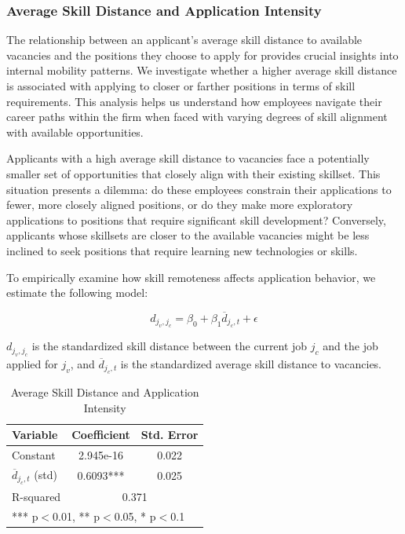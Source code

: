 \documentclass[12pt]{article}
\begin{document}
\subsubsection{Average Skill Distance and Application Intensity}

The relationship between an applicant's average skill distance to available vacancies and the positions they choose to apply for provides crucial insights into internal mobility patterns. We investigate whether a higher average skill distance is associated with applying to closer or farther positions in terms of skill requirements. This analysis helps us understand how employees navigate their career paths within the firm when faced with varying degrees of skill alignment with available opportunities.

Applicants with a high average skill distance to vacancies face a potentially smaller set of opportunities that closely align with their existing skillset. This situation presents a dilemma: do these employees constrain their applications to fewer, more closely aligned positions, or do they make more exploratory applications to positions that require significant skill development? Conversely, applicants whose skillsets are closer to the available vacancies might be less inclined to seek positions that require learning new technologies or skills.

To empirically examine how skill remoteness affects application behavior, we estimate the following model:

\begin{equation}
    d_{j_v, j_c} = \beta_0 + \beta_1 \overline{d}_{j_c, t} + \epsilon
\end{equation}

$d_{j_v, j_c}$ is the standardized skill distance between the current job $j_c$ and the job applied for $j_v$, and $\overline{d}_{j_c, t}$ is the standardized average skill distance to vacancies.


\begin{table}[h]
\centering
\caption{Average Skill Distance and Application Intensity} 
\renewcommand{\arraystretch}{1.2}
\begin{tabular}{lcc}
\hline
\textbf{Variable} & \textbf{Coefficient} & \textbf{Std. Error} \\
\hline
Constant & 2.945e-16 & 0.022 \\
$\overline{d}_{j_c, t}$ (std) & 0.6093*** & 0.025 \\
\hline
R-squared & \multicolumn{2}{c}{0.371} \\
\hline
\multicolumn{3}{l}{*** p$<$0.01, ** p$<$0.05, * p$<$0.1} \\
\end{tabular}
\label{tab:skill_remote_app}
\end{table}
\end{document}
